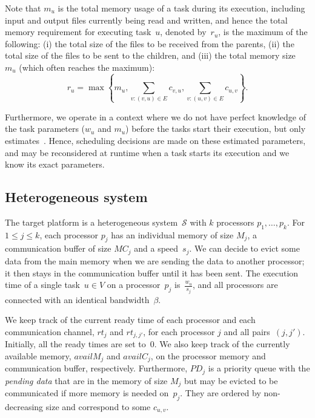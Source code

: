 \documentclass[conference]{IEEEtran}
\newcommand{\cluster}{\,\mathcal{S}}
\newcommand{\MM}{M}
\newcommand{\rt}{rt}
\newcommand{\PD}{PD}
\newcommand{\hmey}[1]{{\color{red}[HM: #1]}}
\newcommand{\AB}[1]{\todo[inline]{{\color{purple}[AB: #1]}}}
\begin{document}
Note that $m_u$ is the total memory usage
of a task during its execution, including input and output files currently being read and written,
and hence the total memory requirement for executing task~$u$, denoted by~$r_u$,  is the maximum of the following:
(i) the total size of the files to be received from the parents, (ii) the total size of the files
to be sent to the children, and (iii) the total memory size~$m_u$ (which often reaches the maximum):
\[
    r_u = \max\left\{m_u , \sum_{v:(v,u)\in E}c_{v,u}, \sum_{v:(u,v)\in E} c_{u,v}\right\}.
\]

Furthermore, we operate in a context where we do not have perfect knowledge
of the task parameters ($w_u$ and $m_u$) before the tasks start their execution,
but only estimates~\cite{rahman2013,GARG2015256}.  
Hence, scheduling decisions are made on these estimated parameters, and
may be reconsidered at runtime when a task starts its execution and we know its exact parameters.


\subsection{Heterogeneous system}
\label{sec.mod.plat}
%
The target platform is a heterogeneous system $\cluster$ with $k$ processors 
    $p_1, \dots, p_k$.
    For $1 \leq j \leq k$, each processor $p_j$  has an individual memory of size $M_j$, a communication
    buffer of size $MC_j$ and a speed~$s_j$.
    We can decide to evict some data from the main memory when we are sending the data
    to another processor; it then stays in the communication buffer until it has been sent.
    The execution time of a single task~$u\in V$ on a processor~$p_j$ is~$\frac{w_u}{s_j}$,
    and all 
    processors are connected with an identical bandwidth~$\beta$.

    We keep track of the current ready time of each processor and each communication
    channel, $\rt_j$ and $\rt_{j,j'}$, for each processor $j$ and all pairs~$(j,j')$.
    Initially, all the ready times are set to~$0$.
    We also keep track of the currently available memory, $availM_j$ and $availC_j$,
    on the processor memory and communication buffer, respectively.
    Furthermore, $\PD_j$ is a priority queue with the {\em pending data}
    that are in the memory of size $\MM_j$ but may be evicted to be communicated if
    more memory is needed on~$p_j$. They are ordered by non-decreasing size and
    correspond to some $c_{u,v}$.
\end{document}
